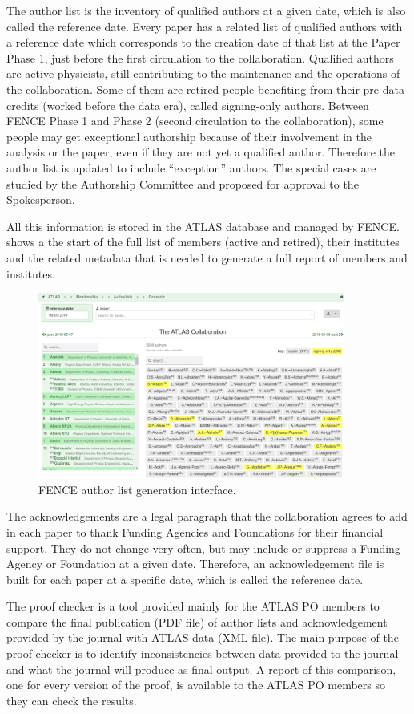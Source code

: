 The author list is the inventory of qualified authors at a given date, which is also called the reference date. Every paper has a related list of qualified authors with a reference date which corresponds to the creation date of that list at the Paper Phase 1, just before the first circulation to the collaboration. Qualified authors are active physicists, still contributing to the maintenance and the operations of the collaboration.
Some of them are retired people benefiting from their pre-data credits (worked before the data era), called signing-only authors.
Between FENCE Phase 1 and Phase 2 (second circulation to the collaboration), some people may get exceptional authorship because of their involvement in the analysis or the paper,
even if they are not yet a qualified author.
Therefore the author list is updated to include \enquote{exception} authors.
The special cases are studied by the Authorship Committee and proposed for approval to the Spokesperson.
 
All this information is stored in the ATLAS database and managed by FENCE\@.
 shows a the start of the full list of members (active and retired), their institutes and the related metadata that is needed to generate a full report of members and institutes.

\begin{figure}[htb]
  \centering
  \includegraphics[width=0.9\textwidth]{figures/authorlist_generation.png}
  \caption{FENCE author list generation interface.}%
  \label{fig:authorlist_generation}
\end{figure}

The acknowledgements are a legal paragraph that the collaboration agrees to add in each paper to thank Funding Agencies and Foundations for their financial support.
They do not change very often, but may include or suppress a Funding Agency or Foundation at a given date.
Therefore, an acknowledgement file is built for each paper at a specific date, which is called the reference date.
 
The proof checker is a tool provided mainly for the ATLAS PO members to compare the final publication (PDF file) of author lists and acknowledgement provided by the journal with ATLAS data (XML file). The main purpose of the proof checker is to identify inconsistencies between data provided to the journal and what the journal will produce as final output. A report of this comparison, one for every version of the proof, is available to the ATLAS PO members so they can check the results.

